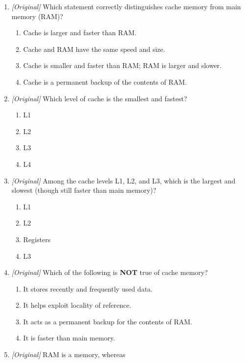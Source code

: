 \begin{enumerate}[label=\textbf{Q\arabic*.}, leftmargin=*]
\begin{enumerate}[label=\Alph*.]
    \item faster
    \item larger
    \item cheaper per bit
  \end{enumerate}
\item \textit{[Original]} Which statement correctly distinguishes cache
  memory from main memory (RAM)?
  \begin{enumerate}[label=\Alph*.]
    \item Cache is larger and faster than RAM.
    \item Cache and RAM have the same speed and size.
    \item Cache is smaller and faster than RAM; RAM is larger and slower.
    \item Cache is a permanent backup of the contents of RAM.
  \end{enumerate}
\item \textit{[Original]} Which level of cache is the smallest and fastest?
  \begin{enumerate}[label=\Alph*.]
    \item L1
    \item L2
    \item L3
    \item L4
  \end{enumerate}
\item \textit{[Original]} Among the cache levels L1, L2, and L3, which is the
  largest and slowest (though still faster than main memory)?
  \begin{enumerate}[label=\Alph*.]
    \item L1
    \item L2
    \item Registers
    \item L3
  \end{enumerate}
\item \textit{[Original]} Which of the following is \textbf{NOT} true of
  cache memory?
  \begin{enumerate}[label=\Alph*.]
    \item It stores recently and frequently used data.
    \item It helps exploit locality of reference.
    \item It acts as a permanent backup for the contents of RAM.
    \item It is faster than main memory.
  \end{enumerate}
\item \textit{[Original]} RAM is a \underline{\hspace{2.2cm}} memory, whereas

\end{enumerate}
